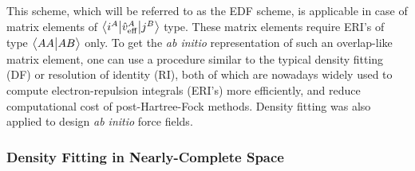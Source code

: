 \documentclass[aip,jcp,amsmath,amssymb,reprint,floatfix]{revtex4-1}
\begin{document}
This scheme, which will be referred to as the EDF scheme, 
is applicable in case of matrix elements of 
$
 \bigl\langle {i^A} \bigl\lvert {\hat{v}_{\rm eff}^A} \bigl\lvert {j^B} \bigr\rangle
$ type. 
 These matrix elements require ERI's of type
$\bigl\langle {AA} \bigl\lvert {AB} \bigr\rangle$ only.
To get the \emph{ab initio} representation of such an overlap\hyp{}like matrix element,
one can use a procedure similar to
the typical density fitting (DF) or resolution of identity (RI), both of which are nowadays widely used 
to compute electron\hyp{}repulsion integrals (ERI's) more efficiently,
and reduce computational cost of post\hyp{}Hartree\hyp{}Fock methods.\cite{Hesselmann.Jansen.Schutz.JCP.2005} Density fitting was also
applied to design \emph{ab initio} force fields.\cite{Piquemal.Cisneros.Reinhardt.Gresh.Darden.JCP.2006,Cisneros.Andres.Piquemal.Darden.JCP.2005}

\subsubsection{\label{sss:2.3.1.GDF-1}Density Fitting in Nearly-Complete Space}
\end{document}
